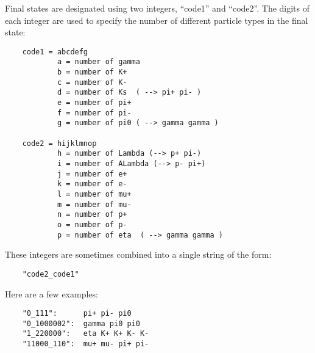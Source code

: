 \documentclass[11pt]{article}
\begin{document}
Final states are designated using two integers, ``code1'' and ``code2''.  The digits of each integer are used to specify the number of different particle types in the final state:
\begin{verbatim}
    code1 = abcdefg
            a = number of gamma
            b = number of K+ 
            c = number of K- 
            d = number of Ks  ( --> pi+ pi- )
            e = number of pi+ 
            f = number of pi- 
            g = number of pi0 ( --> gamma gamma )

    code2 = hijklmnop
            h = number of Lambda (--> p+ pi-)
            i = number of ALambda (--> p- pi+)
            j = number of e+
            k = number of e- 
            l = number of mu+ 
            m = number of mu-
            n = number of p+ 
            o = number of p- 
            p = number of eta  ( --> gamma gamma )
\end{verbatim}
These integers are sometimes combined into a single string of the form:
\begin{verbatim}
    "code2_code1"
\end{verbatim}
Here are a few examples:
\begin{verbatim}
    "0_111":      pi+ pi- pi0
    "0_1000002":  gamma pi0 pi0
    "1_220000":   eta K+ K+ K- K-
    "11000_110":  mu+ mu- pi+ pi-
\end{verbatim}
\end{document}
